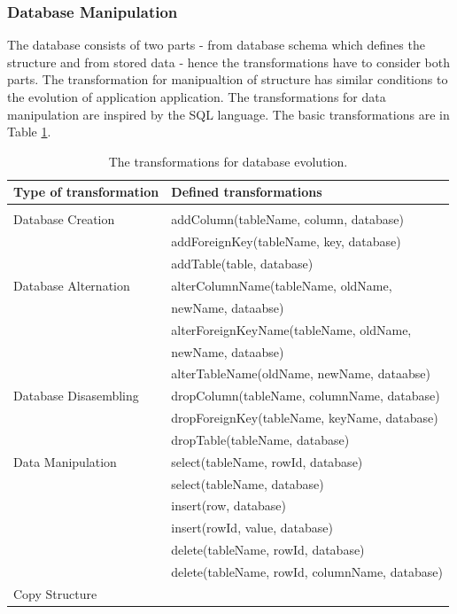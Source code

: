 \documentclass[runningheads]{comsis}
\begin{document}
\subsubsection{Database Manipulation}
\label{sec:db-evolution}
The database consists of two parts - from database schema which defines the structure and from stored data - hence the transformations have to consider both parts. The transformation for manipualtion of structure has similar conditions to the evolution of application application. The transformations for data manipulation are inspired by the SQL language. The basic transformations are in Table \ref{tab:db-basic-evolution}. 
\begin{table}
\caption{The transformations for database evolution.}
	\label{tab:db-basic-evolution}
\centering
\setlength\tabcolsep{0.5em}
	\begin{tabular}{ll}
	\hline
	Type of transformation & Defined transformations \\
	\hline
	\\[-2ex] Database Creation
	& addColumn(tableName, column, database) \\
	& addForeignKey(tableName, key, database) \\
	& addTable(table, database)\\
	Database Alternation
	& alterColumnName(tableName, oldName, \\ & \hspace{0.5in}newName, dataabse) \\
	& alterForeignKeyName(tableName, oldName, \\ & \hspace{0.5in}newName, dataabse) \\
	& alterTableName(oldName, newName, dataabse) \\
	Database Disasembling
	& dropColumn(tableName, columnName, database) \\
	& dropForeignKey(tableName, keyName, database) \\
	& dropTable(tableName, database) \\
	Data Manipulation
	& select(tableName, rowId, database) \\
	& select(tableName, database) \\
	& insert(row, database) \\
	& insert(rowId, value, database) \\
	& delete(tableName, rowId, database) \\
	& delete(tableName, rowId, columnName, database) \\
	Copy Structure

\end{tabular}
\end{table}
\end{document}

